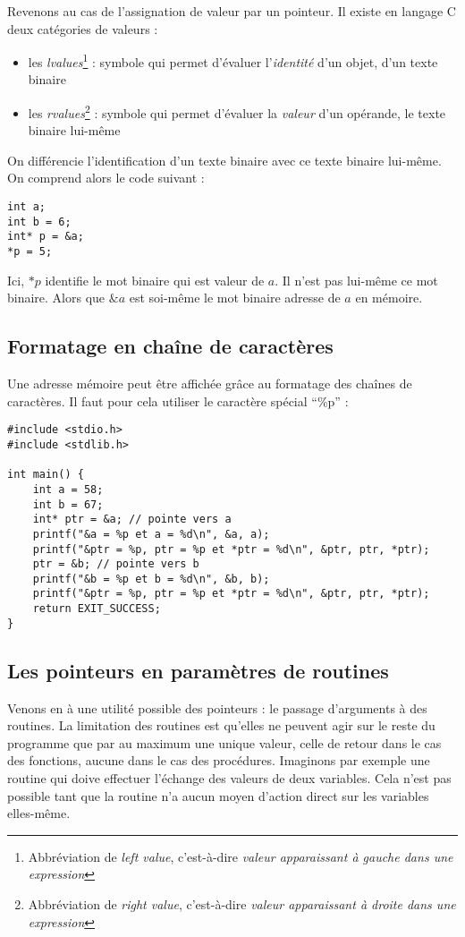 \documentclass[../../../main.tex]{subfiles}
\begin{document}
Revenons au cas de l'assignation de valeur par un pointeur. Il existe en langage C deux catégories de valeurs :
\begin{itemize}
	\item les \textit{lvalues}\footnote{Abbréviation de \textit{left value}, c'est-à-dire \textit{valeur apparaissant à gauche dans une expression}} : symbole qui permet d'évaluer l'\textit{identité} d'un objet, d'un texte binaire
	\item les \textit{rvalues}\footnote{Abbréviation de \textit{right value}, c'est-à-dire \textit{valeur apparaissant à droite dans une expression}} : symbole qui permet d'évaluer la \textit{valeur} d'un opérande, le texte binaire lui-même
\end{itemize}
On différencie l'identification d'un texte binaire avec ce texte binaire lui-même. On comprend alors le code suivant :
\begin{verbatim}
int a;
int b = 6;
int* p = &a;
*p = 5;
\end{verbatim}
Ici, $*p$ identifie le mot binaire qui est valeur de $a$. Il n'est pas lui-même ce mot binaire. Alors que $\&a$ est soi-même le mot binaire adresse de $a$ en mémoire.

\subsection{Formatage en chaîne de caractères}
\label{sub:formatage_en_cha_ne_de_caract_res}
Une adresse mémoire peut être affichée grâce au formatage des chaînes de caractères. Il faut pour cela utiliser le caractère spécial ``\%p'' :
\begin{verbatim}
#include <stdio.h>
#include <stdlib.h>

int main() {
	int a = 58;
	int b = 67;
	int* ptr = &a; // pointe vers a
	printf("&a = %p et a = %d\n", &a, a);
	printf("&ptr = %p, ptr = %p et *ptr = %d\n", &ptr, ptr, *ptr);
	ptr = &b; // pointe vers b
	printf("&b = %p et b = %d\n", &b, b);
	printf("&ptr = %p, ptr = %p et *ptr = %d\n", &ptr, ptr, *ptr);
	return EXIT_SUCCESS;
}
\end{verbatim}
\subsection{Les pointeurs en paramètres de routines}
\label{sub:les_pointeurs_en_param_tres_de_routines}
Venons en à une utilité possible des pointeurs : le passage d'arguments à des routines. La limitation des routines est qu'elles ne peuvent agir sur le reste du programme que par au maximum une unique valeur, celle de retour dans le cas des fonctions, aucune dans le cas des procédures. Imaginons par exemple une routine qui doive effectuer l'échange des valeurs de deux variables. Cela n'est pas possible tant que la routine n'a aucun moyen d'action direct sur les variables elles-même.
\end{document}
